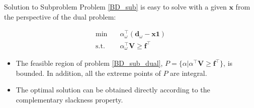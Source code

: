 
\begin{frame}{Solution to Subproblem}
  Problem \eqref{BD_sub} is easy to solve with a given $\mathbf{x}$ from the perspective of the dual problem:

  \begin{equation}\label{BD_sub_dual}
    \begin{aligned}
      \min \quad & \alpha^{\intercal}_{\omega} (\mathbf{d}_{\omega}- \mathbf{x} \mathbf{1}) \\
      \text {s.t.} \quad & \alpha^{\intercal}_{\omega} \mathbf{V} \geq \mathbf{f}^{\intercal}
    \end{aligned}
    \end{equation}

    \begin{itemize}
      \item The feasible region of problem \eqref{BD_sub_dual}, $P= \{\alpha|\alpha^{\intercal} \mathbf{V} \geq \mathbf{f}^{\intercal}\}$, is bounded. In addition, all the extreme points of $P$ are integral.
      \item The optimal solution can be obtained directly according to the complementary slackness property.
    \end{itemize}
\end{frame}

